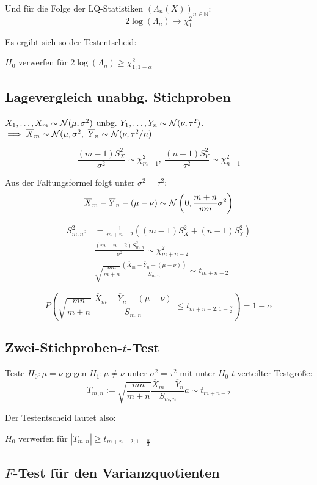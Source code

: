 Und für die Folge der LQ-Statistiken \((\Lambda_n(X))_{n \in \mathbb{N}}\):
\[ 2 \log(\Lambda_n) \to \chi_1^2 \]

Es ergibt sich so der Testentscheid:

\(H_0\) verwerfen für \(2 \log(\Lambda_n) \geq \chi_{1;1-\alpha}^2\)

\subsection*{Lagevergleich unabhg. Stichproben}

\(X_1,\dots,X_m \sim \mathcal{N}(\mu,\sigma^2)\) unbg. \(Y_1,\dots,Y_n \sim \mathcal{N}(\nu,\tau^2)\).
\(\implies \overline X_m \sim \mathcal{N}(\mu,\sigma^2, \ \overline Y_n \sim \mathcal{N}(\nu,\tau^2/n)\)

\[ \frac{(m-1)S_X^2}{\sigma^2} \sim \chi_{m-1}^2, \ \frac{(n-1)S_Y^2}{\tau^2} \sim \chi_{n-1}^2 \]

Aus der Faltungsformel folgt unter \(\sigma^2 = \tau^2\):
\[ \overline X_m - \overline Y_n - (\mu - \nu) \sim \mathcal{N}\left(0,\frac{m+n}{mn} \sigma^2\right) \]

\vspace*{-5mm}
\begin{align*}
S_{m,n}^2 :&= \frac{1}{m+n-2} \left((m-1)S_X^2 + (n-1)S_Y^2\right) \\
&\frac{(m+n-2)S_{m,n}^2}{\sigma^2} \sim \chi_{m+n-2}^2 \\
&\sqrt{\frac{mn}{m+n}}\frac{\left(\overline X_m - \overline Y_n - (\mu-\nu)\right)}{S_{m,n}} \sim t_{m+n-2}
\end{align*}

\[ P\left( \sqrt{\frac{mn}{m+n}} \frac{|\overline X_m - \overline Y_n - (\mu-\nu)|}{S_{m,n}} \leq t_{m+n-2;1-\frac{\alpha}{2}} \right) = 1-\alpha \]

\subsection*{Zwei-Stichproben-\(t\)-Test}

Teste \(H_0 : \mu = \nu\) gegen \(H_1 : \mu \neq \nu\) unter \(\sigma^2=\tau^2\) mit unter \(H_0\) \(t\)-verteilter Testgröße:
\[ T_{m,n} := \sqrt{\frac{mn}{m+n}} \frac{\overline X_m - \overline Y_n}{S_{m,n}}a \sim t_{m+n-2} \]

Der Testentscheid lautet also:

\(H_0\) verwerfen für \(|T_{m,n}| \geq t_{m+n-2;1-\frac{\alpha}{2}}\)

\subsection*{\(F\)-Test für den Varianzquotienten}

